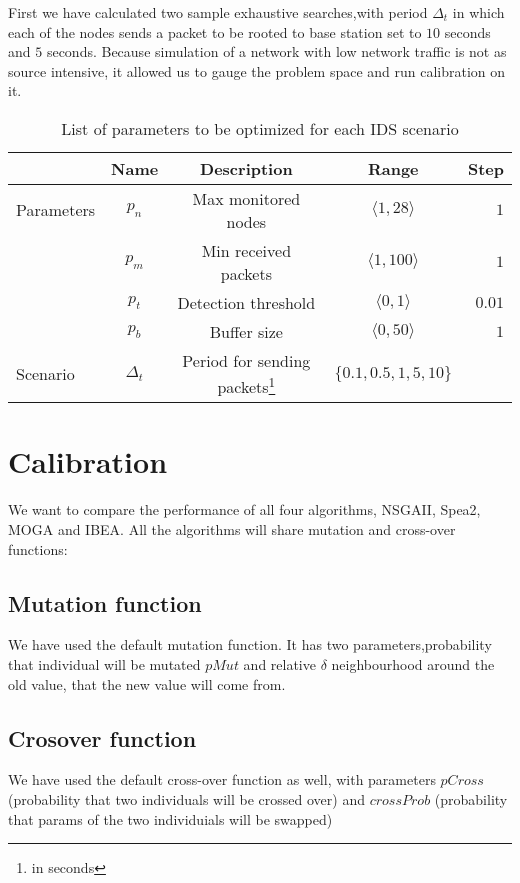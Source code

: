 \documentclass[12pt,oneside]{fithesis2}
\begin{document}
First we have calculated two sample exhaustive searches,with period $\Delta_t$ in which each of the nodes sends a packet to be rooted to base station set to $10$ seconds and $5$ seconds. Because simulation of a network with low network traffic is not as source intensive, it allowed us to gauge the problem space and run calibration on it.  

\begin{table}
  \centering
\begin{tabular}{ l c c c r}
  & Name & Description & Range & Step \\  
  \hline
  \hline                        
   Parameters & $p_n$ & Max monitored nodes & $\langle 1, 28 \rangle$ & $1$ \\
    & $p_m$ & Min received packets & $\langle 1, 100 \rangle$ & $1$ \\
    & $p_t$ & Detection threshold & $\langle 0, 1 \rangle$ & $0.01$ \\
    & $p_b$ & Buffer size & $\langle 0, 50 \rangle$ & $1$ \\
  \hline  
  \hline
  Scenario & $\Delta_t$ & Period for sending packets\footnote{in seconds} &  $\{ 0.1,0.5,1,5,10\}$  & \\
\end{tabular}
  \caption{List of parameters to be optimized for each IDS scenario}
  \label{tab:myfirsttable}
\end{table}

\section{Calibration}

We want to compare the performance of all four algorithms, NSGAII, Spea2, MOGA and IBEA. All the algorithms will share mutation and cross-over functions:

\subsection{Mutation function}
We have used the default mutation function. It has two parameters,probability that individual will be mutated $pMut$ and relative $\delta$ neighbourhood around the old value, that the new value will come from.

\subsection{Crosover function}
We have used the default cross-over function as well, with parameters $pCross$ (probability that two individuals will be crossed over) and $crossProb$ (probability that params of the two individuials will be swapped)
\end{document}
